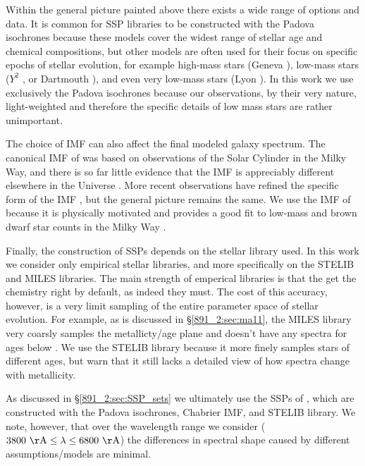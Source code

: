 Within the general picture painted above there exists a wide range of
options and data. It is common for SSP libraries to be constructed
with the Padova isochrones \citep{Bertelli94, Girardi00, Marigo08}
because these models cover the widest range of stellar age and
chemical compositions, but other models are often used for their focus
on specific epochs of stellar evolution, for example high-mass stars
(Geneva \citep{Schaller92,Meynet00}), low-mass stars ($Y^2$
\citep{Yi01,Yi03}, or Dartmouth \citep{Dotter08}), and even very
low-mass stars (Lyon \citep{Chabrier97,Baraffe98}). In this work we
use exclusively the Padova isochrones because our observations, by
their very nature, light-weighted and therefore the specific details
of low mass stars are rather unimportant.

The choice of IMF can also affect the final modeled galaxy
spectrum. The canonical IMF of \citet{Salpeter55} was based on
observations of the Solar Cylinder in the Milky Way, and there is so
far little evidence that the IMF is appreciably different elsewhere in
the Universe \citep{Bastian10}. More recent observations have refined
the specific form of the IMF \citep{Kroupa01, Chabrier03}, but the
general picture remains the same. We use the IMF of \citet{Chabrier03}
because it is physically motivated and provides a good fit to low-mass
and brown dwarf star counts in the Milky Way
\citep{Bruzual03,Chabrier01,Chabrier03}.

Finally, the construction of SSPs depends on the stellar library
used. In this work we consider only empirical stellar libraries, and
more specifically on the STELIB \citep{LeBorgne03} and MILES
\citep{Sanchez-Blazquez06} libraries. The main strength of emperical
libraries is that the get the chemistry right by default, as indeed
they must. The cost of this accuracy, however, is a very limit
sampling of the entire parameter space of stellar evolution. For
example, as is discussed in \S\ref{891_2:sec:ma11}, the MILES library very
coarsly samples the metallicty/age plane and doesn't have any spectra
for ages below . We use the STELIB library because it
more finely samples stars of different ages, but warn that it still
lacks a detailed view of how spectra change with metallicity.

As discussed in \S\ref{891_2:sec:SSP_sets} we ultimately use the SSPs of
\citet{Bruzual03}, which are constructed with the Padova isochrones,
Chabrier IMF, and STELIB library. We note, however, that over the
wavelength range we consider ($\val{3800}{\AA} \leq\lambda\leq
\val{6800}{\AA}$) the differences in spectral shape caused by
different assumptions/models are minimal.

